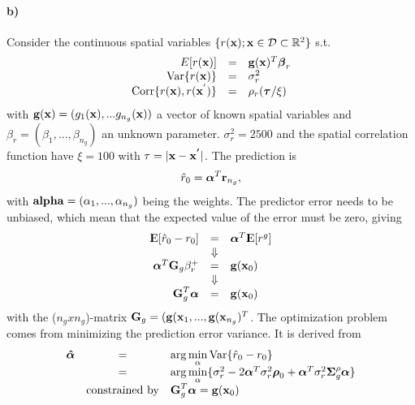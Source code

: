 \paragraph{b)}
Consider the continuous spatial variables $\{r(\boldsymbol{\mathbf{x}}); \boldsymbol{\mathbf{x}} \in \mathcal{D} \subset \mathbb{R}^2\}$ s.t.
\begin{equation}
\begin{array}{rcl}
     E[r(\boldsymbol{\mathbf{x}})] & = & \boldsymbol{\mathbf{g}}(\boldsymbol{\mathbf{x}})^T\boldsymbol{\mathbf{\beta}}_r \\
     \mathrm{Var}\{r(\boldsymbol{\mathbf{x}})\} & = & \sigma_r^2 \\
     \mathrm{Corr}\{r(\boldsymbol{\mathbf{x}}),r(\boldsymbol{\mathbf{x}}^{'})\} & = & \rho_r(\boldsymbol{\mathbf{\tau}}/\xi)
\end{array}
\end{equation}
with $\boldsymbol{\mathbf{g}}(\boldsymbol{\mathbf{x}}) = (g_1(\boldsymbol{\mathbf{x}}), ... g_{n_g}(\boldsymbol{\mathbf{x}}))$ a vector of known spatial variables and $\beta_r = (\beta_1, ..., \beta_{n_g})$ an unknown parameter. $\sigma_r^2 = 2500$ and the spatial correlation function have $\xi = 100$ with $\tau = |\boldsymbol{\mathbf{x}} - \boldsymbol{\mathbf{x^{'}}}|$. The prediction is 
\begin{equation}
    \hat{r}_0 = \boldsymbol{\mathbf{\alpha}}^T\boldsymbol{\mathbf{r}}_{n_g},
\end{equation}
with $\boldsymbol{\mathbf{alpha}} = (\alpha_1, ..., \alpha_{n_g})$ being the weights. 
The predictor error needs to be unbiased, which mean that the expected value of the error must be zero, giving
\begin{equation*}
\begin{array}{rcl}
    {\rm I\kern-.3em E}[\hat{r}_0 - r_0] & = & \boldsymbol{\mathbf{\alpha}}^T {\rm I\kern-.3em E}[r^g]\\
      & \Downarrow & \\
      \boldsymbol{\mathbf{\alpha}}^T \boldsymbol{\mathbf{G}}_g \beta_r^+ & = & \boldsymbol{\mathbf{g}}(\boldsymbol{\mathbf{x}}_0) \\
      & \Downarrow & \\
      \boldsymbol{\mathbf{G}}_g^T \boldsymbol{\mathbf{\alpha}} & = & \boldsymbol{\mathbf{g}}(\boldsymbol{\mathbf{x}}_0)
\end{array}
\end{equation*}
with the ($n_g x n_g$)-matrix $\boldsymbol{\mathbf{G}}_g = (\boldsymbol{\mathbf{g}}(\boldsymbol{\mathbf{x}}_1,...,\boldsymbol{\mathbf{g}}(\boldsymbol{\mathbf{x}}_{n_g})^T$.
The optimization problem comes from minimizing the prediction error variance. It is derived from
\begin{equation*}
    \begin{array}{rcl}
        \boldsymbol{\mathbf{\hat{\alpha}}} & = & \arg\min\limits_\alpha \mathrm{Var}\{\hat{r}_0 - r_0\} \\
         & = & \arg\min\limits_\alpha\{\sigma_r^2 - 2\boldsymbol{\mathbf{\alpha}}^T\sigma_r^2\boldsymbol{\mathbf{\rho}}_0 + \boldsymbol{\mathbf{\alpha}}^T\sigma_r^2\boldsymbol{\mathbf{\Sigma}}_g^\rho \boldsymbol{\mathbf{\alpha}}\} \\
          & \textrm{constrained by} & \boldsymbol{\mathbf{G}}_g^T \boldsymbol{\mathbf{\alpha}} = \boldsymbol{\mathbf{g}}(\boldsymbol{\mathbf{x}}_0)
    \end{array}
\end{equation*}
